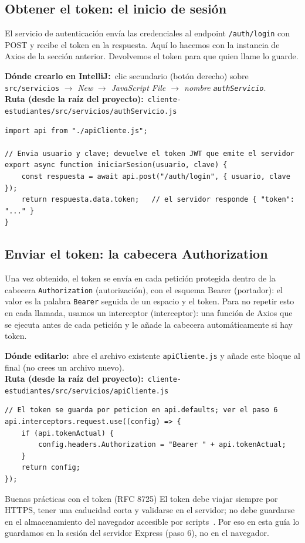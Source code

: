 \documentclass[11pt]{article}
\newcommand{\dondecrear}[3]{\begin{ubic}{\footnotesize\textbf{\color{ndverdeo}D\'onde crearlo en IntelliJ:}~clic secundario (bot\'on derecho) sobre \texttt{#1} $\rightarrow$ \emph{New} $\rightarrow$ \emph{#2}.\\[2pt]\textbf{\color{ndverdeo}Ruta (desde la ra\'iz del proyecto):}~\texttt{#3}}\end{ubic}\nobreak\vspace{3pt}}
\newcommand{\editaren}[2]{\begin{ubic}{\footnotesize\textbf{\color{ndverdeo}D\'onde editarlo:}~abre el archivo existente #1.\\[2pt]\textbf{\color{ndverdeo}Ruta (desde la ra\'iz del proyecto):}~\texttt{#2}}\end{ubic}\nobreak\vspace{3pt}}
\begin{document}
\subsection{Obtener el token: el inicio de sesión}
El servicio de autenticación envía las credenciales al endpoint \texttt{/auth/\allowbreak{}login} con POST y recibe el token en la respuesta. Aquí lo hacemos con la instancia de Axios de la sección anterior. Devolvemos el token para que quien llame lo guarde.

\dondecrear{src/servicios}{JavaScript File $\rightarrow$ nombre \texttt{authServicio}}{cliente-estudiantes/src/servicios/authServicio.js}
\begin{cajacodigo}
\begin{lstlisting}[style=js]
import api from "./apiCliente.js";

// Envia usuario y clave; devuelve el token JWT que emite el servidor
export async function iniciarSesion(usuario, clave) {
	const respuesta = await api.post("/auth/login", { usuario, clave });
	return respuesta.data.token;   // el servidor responde { "token": "..." }
}
\end{lstlisting}
\end{cajacodigo}
\vspace{2pt}

\subsection{Enviar el token: la cabecera Authorization}
Una vez obtenido, el token se envía en cada petición protegida dentro de la cabecera \texttt{Authorization} (autorización), con el esquema Bearer (portador): el valor es la palabra \texttt{Bearer} seguida de un espacio y el token. Para no repetir esto en cada llamada, usamos un interceptor (interceptor): una función de Axios que se ejecuta antes de cada petición y le añade la cabecera automáticamente si hay token.

\editaren{\texttt{apiCliente.js} y añade este bloque al final (no crees un archivo nuevo)}{cliente-estudiantes/src/servicios/apiCliente.js}
\begin{cajacodigo}
\begin{lstlisting}[style=js]
// El token se guarda por peticion en api.defaults; ver el paso 6
api.interceptors.request.use((config) => {
	if (api.tokenActual) {
		config.headers.Authorization = "Bearer " + api.tokenActual;
	}
	return config;
});
\end{lstlisting}
\end{cajacodigo}
\vspace{2pt}
\begin{cajawarn}{Buenas prácticas con el token (RFC 8725)}
El token debe viajar siempre por HTTPS, tener una caducidad corta y validarse en el servidor; no debe guardarse en el almacenamiento del navegador accesible por scripts~\citep{rfc8725jwtbcp,owasp2021top10}. Por eso en esta guía lo guardamos en la sesión del servidor Express (paso 6), no en el navegador.\par
\end{cajawarn}
\end{document}
